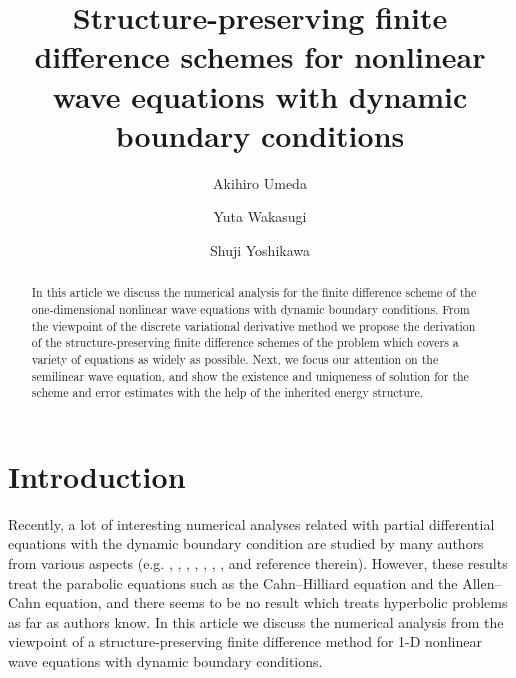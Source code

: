 \documentclass[dvipdfmx-if-dvi,autodetect-engine,ja=standard]{amsart}
\title[FDM for wave equations with dynamic boundary conditions]{
Structure-preserving finite difference schemes
for nonlinear wave equations with dynamic boundary conditions}
\author[A. Umeda]{Akihiro Umeda}
\author[Y. Wakasugi]{Yuta Wakasugi}
\author[S. Yoshikawa]{Shuji Yoshikawa}
\numberwithin{equation}{section} %
\begin{document}
\begin{abstract}
In this article we discuss the numerical analysis for the finite difference scheme of the one-dimensional nonlinear 
wave equations with dynamic boundary conditions. From the viewpoint of the discrete variational derivative method 
we propose the derivation of the structure-preserving finite difference schemes of the problem which covers a variety of equations as 
widely as possible. Next, we focus our attention on the semilinear wave equation, and show the existence and uniqueness of solution for 
the scheme and error estimates with the help of the inherited energy structure. 
\end{abstract}

\maketitle
\tableofcontents


\section{Introduction}
Recently, a lot of interesting numerical analyses related with partial differential equations with the dynamic boundary condition are 
studied by many authors from various aspects (e.g. \cite{ch-pe}, \cite{4}, \cite{ko-lu2}, \cite{is-mi-pe}, \cite{na1}, \cite{na2}, \cite{fu-ok}, \cite{5} and 
reference therein). 
However, these results treat the parabolic equations such as the Cahn--Hilliard equation and the Allen--Cahn equation, and 
there seems to be no result which treats hyperbolic problems as far as authors know. 
In this article we discuss the numerical analysis from the viewpoint of a structure-preserving finite difference method for 1-D nonlinear wave equations 
with dynamic boundary conditions. 
\end{document}
